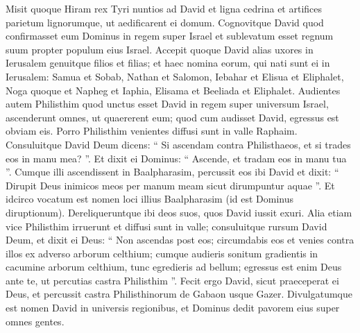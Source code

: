 \begin{biblechapter}
\begin{biblechapter}
\begin{biblechapter}
\begin{biblechapter}
\begin{biblechapter}
\begin{biblechapter}
\begin{biblechapter}
\begin{biblechapter}
\begin{biblechapter}
\begin{biblechapter}
\begin{biblechapter}
\begin{biblechapter}
\begin{biblechapter}
\begin{biblechapter}
\verse Misit quoque Hiram rex Tyri nuntios ad David et ligna cedrina et artifices parietum lignorumque, ut aedificarent ei domum. 
\verse Cognovitque David quod confirmasset eum Dominus in regem super Israel et sublevatum esset regnum suum propter populum eius Israel.
 \verse Accepit quoque David alias uxores in Ierusalem genuitque filios et filias; 
 \verse et haec nomina eorum, qui nati sunt ei in Ierusalem: Samua et Sobab, Nathan et Salomon, 
\verse Iebahar et Elisua et Eliphalet, 
\verse Noga quoque et Napheg et Iaphia, 
\verse Elisama et Beeliada et Eliphalet.
 \verse Audientes autem Philisthim quod unctus esset David in regem super universum Israel, ascenderunt omnes, ut quaererent eum; quod cum audisset David, egressus est obviam eis. 
\verse Porro Philisthim venientes diffusi sunt in valle Raphaim. 
 \verse Consuluitque David Deum dicens: “ Si ascendam contra Philisthaeos, et si trades eos in manu mea? ”. Et dixit ei Dominus: “ Ascende, et tradam eos in manu tua ”. 
\verse Cumque illi ascendissent in Baalpharasim, percussit eos ibi David et dixit: “ Dirupit Deus inimicos meos per manum meam sicut dirumpuntur aquae ”. Et idcirco vocatum est nomen loci illius Baalpharasim (id est Dominus diruptionum). 
\verse Dereliqueruntque ibi deos suos, quos David iussit exuri.
 \verse Alia etiam vice Philisthim irruerunt et diffusi sunt in valle; 
\verse consuluitque rursum David Deum, et dixit ei Deus: “ Non ascendas post eos; circumdabis eos et venies contra illos ex adverso arborum celthium; 
\verse cumque audieris sonitum gradientis in cacumine arborum celthium, tunc egredieris ad bellum; egressus est enim Deus ante te, ut percutias castra Philisthim ”. 
 \verse Fecit ergo David, sicut praeceperat ei Deus, et percussit castra Philisthinorum de Gabaon usque Gazer. 
\verse Divulgatumque est nomen David in universis regionibus, et Dominus dedit pavorem eius super omnes gentes.
 

\end{biblechapter}
\end{biblechapter}
\end{biblechapter}
\end{biblechapter}
\end{biblechapter}
\end{biblechapter}
\end{biblechapter}
\end{biblechapter}
\end{biblechapter}
\end{biblechapter}
\end{biblechapter}
\end{biblechapter}
\end{biblechapter}
\end{biblechapter}
